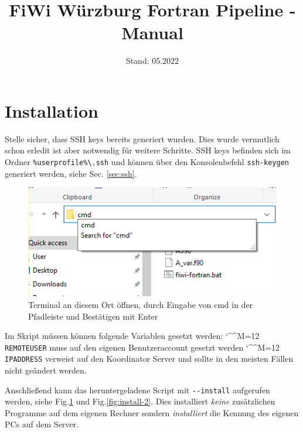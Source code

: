 \documentclass[11pt, a4paper]{article}
\title{\vspace{+3cm}FiWi Würzburg Fortran Pipeline - Manual}
\date{Stand: 05.2022}
\newcommand{\bs}{\textbackslash}
\def\e{\begingroup\catcode`\^^M=12 \xmymacro}
{\catcode`\^^M=12 %
 \gdef\xmymacro#1^^M{\begin{itemize}\item #1\end{itemize}\endgroup}%
}
\begin{document}
\maketitle

\bigskip\noindent

\newpage

\tableofcontents
\label{summary}

\newpage


\vspace{-1cm}
\section{Installation}


Stelle sicher, dass SSH keys bereits generiert wurden. Dies wurde vermutlich schon erledit ist aber notwendig für weitere Schritte.
SSH keys befinden sich im Ordner \texttt{\%userprofile\%\bs.ssh} und können über den Konsolenbefehl \texttt{ssh-keygen} generiert werden, siehe Sec. \ref{sec:ssh}.

\begin{figure}
    \centering
    \includegraphics[width=0.85\linewidth]{./pics/2022-03-16_15-36.png}
    \caption{Terminal an diesem Ort öffnen, durch Eingabe von cmd in der Pfadleiste und Bestätigen mit Enter}
    \vspace{-4em}
    \label{fig:install-1}
\end{figure}

Im Skript müssen können folgende Variablen gesetzt werden:
\e \texttt{REMOTEUSER} muss auf den eigenen Benutzeraccount gesetzt werden
\e \texttt{IPADDRESS} verweist auf den Koordinator Server und sollte in den meisten Fällen nicht geändert werden.

Anschließend kann das heruntergeladene Script mit \texttt{-{}-install} aufgerufen werden, siehe Fig.\ref{fig:install-1} und Fig.\ref{fig:install-2}. Dies installiert \emph{keine} zusätzlichen Programme auf dem eigenen Rechner sondern \emph{installiert} die Kennung des eigenen PCs auf dem Server.
\end{document}
